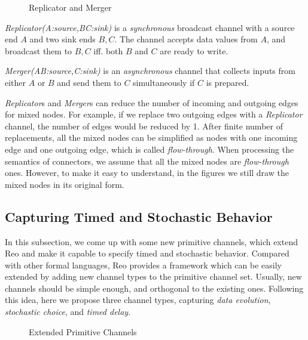\begin{figure}[H]
    \centering
    
    \caption{Replicator and Merger}
\end{figure}

\begin{description}
    \item \emph{Replicator(A:source,B\:C:sink)} is a \emph{synchronous} broadcast channel with a source end $A$ and two sink ends $B,C$. The channel accepts data values from $A$, and broadcast them to $B,C$ iff. both $B$ and $C$ are ready to write.
    \item \emph{Merger(A\:B:source,C:sink)}
    is an \emph{asynchronous} channel that collects inputs from either $A$ or $B$ and send them to $C$ simultaneously if $C$ is prepared.
\end{description}

\emph{Replicator}s and \emph{Merger}s can reduce the number of incoming and outgoing edges for mixed nodes. For example, if we replace two outgoing edges with a \emph{Replicator} channel, the number of edges would be reduced by 1. After finite number of replacements, all the mixed nodes can be simplified as nodes with one incoming edge and one outgoing edge, which is called \emph{flow-through}.
When processing the semantics of connectors, we assume that all the mixed nodes are \emph{flow-through} ones. However, to make it easy to understand, in the figures we still draw the mixed nodes in its original form.

\subsection{Capturing Timed and Stochastic Behavior}

In this subsection, we come up with some new primitive channels, which extend Reo and make it capable to specify timed and stochastic behavior.
Compared with other formal languages, Reo provides a framework which can be easily extended by adding new channel types to the primitive channel set. Usually, new channels should be simple enough, and orthogonal to the existing ones. Following this idea, here we propose three channel types, capturing \emph{data evolution}, \emph{stochastic choice}, and \emph{timed delay}.

\begin{figure}[t]
    \centering
    \label{fig:newchannels}
    
    \caption{Extended Primitive Channels}
\end{figure}

